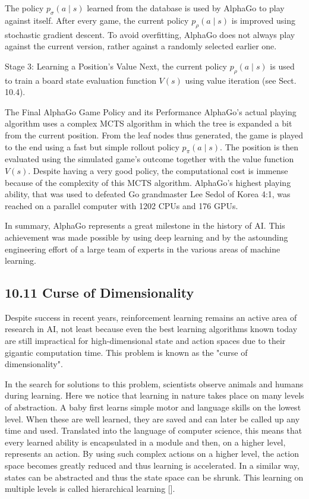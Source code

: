 \documentclass[10pt]{article}
\begin{document}
The policy $p_{\sigma}(a \mid s)$ learned from the database is used by AlphaGo to play against itself. After every game, the current policy $p_{\rho}(a \mid s)$ is improved using stochastic gradient descent. To avoid overfitting, AlphaGo does not always play against the current version, rather against a randomly selected earlier one.

Stage 3: Learning a Position's Value Next, the current policy $p_{\rho}(a \mid s)$ is used to train a board state evaluation function $V(s)$ using value iteration (see Sect. 10.4).

The Final AlphaGo Game Policy and its Performance AlphaGo's actual playing algorithm uses a complex MCTS algorithm in which the tree is expanded a bit from the current position. From the leaf nodes thus generated, the game is played to the end using a fast but simple rollout policy $p_{\pi}(a \mid s)$. The position is then evaluated using the simulated game's outcome together with the value function $V(s)$. Despite having a very good policy, the computational cost is immense because of the complexity of this MCTS algorithm. AlphaGo's highest playing ability, that was used to defeated Go grandmaster Lee Sedol of Korea 4:1, was reached on a parallel computer with 1202 CPUs and 176 GPUs.

In summary, AlphaGo represents a great milestone in the history of AI. This achievement was made possible by using deep learning and by the astounding engineering effort of a large team of experts in the various areas of machine learning.

\subsection*{10.11 Curse of Dimensionality}
Despite success in recent years, reinforcement learning remains an active area of research in AI, not least because even the best learning algorithms known today are still impractical for high-dimensional state and action spaces due to their gigantic computation time. This problem is known as the "curse of dimensionality".

In the search for solutions to this problem, scientists observe animals and humans during learning. Here we notice that learning in nature takes place on many levels of abstraction. A baby first learns simple motor and language skills on the lowest level. When these are well learned, they are saved and can later be called up any time and used. Translated into the language of computer science, this means that every learned ability is encapsulated in a module and then, on a higher level, represents an action. By using such complex actions on a higher level, the action space becomes greatly reduced and thus learning is accelerated. In a similar way, states can be abstracted and thus the state space can be shrunk. This learning on multiple levels is called hierarchical learning [\cite{barto2003recent}].
\end{document}
